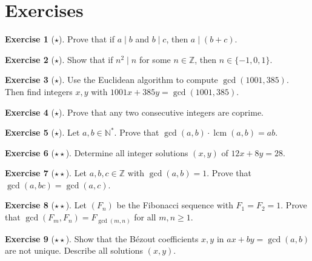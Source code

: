 \documentclass[12pt,a4paper,openany]{book}
\theoremstyle{definition}
\newtheorem{exercise}{Exercise}[chapter]
\theoremstyle{plain}
\theoremstyle{remark}
\newcommand{\N}{\mathbb{N}}
\newcommand{\Z}{\mathbb{Z}}
\DeclareMathOperator{\lcm}{lcm}
\begin{document}
\section{Exercises}
\label{sec:ch1-exercises}

\begin{exercise}[$\star$]
\label{exer:ch1-basic-div}
Prove that if $a \mid b$ and $b \mid c$, then $a \mid (b + c)$.
\end{exercise}

\begin{exercise}[$\star$]
\label{exer:ch1-div-square}
Show that if $n^2 \mid n$ for some $n \in \Z$, then $n \in \{-1, 0, 1\}$.
\end{exercise}

\begin{exercise}[$\star$]
\label{exer:ch1-euclidean-compute}
Use the Euclidean algorithm to compute $\gcd(1001, 385)$. Then find integers
$x, y$ with $1001x + 385y = \gcd(1001, 385)$.
\end{exercise}

\begin{exercise}[$\star$]
\label{exer:ch1-consecutive}
Prove that any two consecutive integers are coprime.
\end{exercise}

\begin{exercise}[$\star$]
\label{exer:ch1-gcd-lcm}
Let $a, b \in \N^{*}$. Prove that $\gcd(a,b) \cdot \lcm(a,b) = ab$.
\end{exercise}

\begin{exercise}[$\star\star$]
\label{exer:ch1-linear-diophantine}
Determine all integer solutions $(x,y)$ of $12x + 8y = 28$.
\end{exercise}

\begin{exercise}[$\star\star$]
\label{exer:ch1-coprime-product}
Let $a, b, c \in \Z$ with $\gcd(a,b) = 1$. Prove that $\gcd(a, bc) = \gcd(a,c)$.
\end{exercise}

\begin{exercise}[$\star\star$]
\label{exer:ch1-fibonacci-gcd}
Let $(F_n)$ be the Fibonacci sequence with $F_1 = F_2 = 1$. Prove that
$\gcd(F_m, F_n) = F_{\gcd(m,n)}$ for all $m, n \ge 1$.
\end{exercise}

\begin{exercise}[$\star\star$]
\label{exer:ch1-bezout-unique}
Show that the B\'{e}zout coefficients $x, y$ in $ax + by = \gcd(a,b)$ are not
unique. Describe all solutions $(x,y)$.
\end{exercise}
\end{document}
